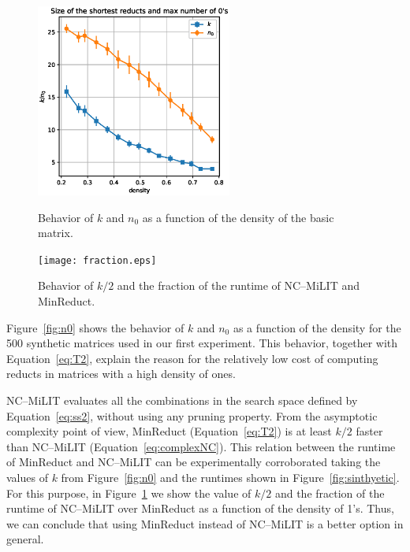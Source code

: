\documentclass[citenumber]{llncs}
\begin{document}
	\begin{figure}[hbt] 
		\begin{minipage}[t]{.48\linewidth}
			\begin{center}
				\includegraphics[height=2.5in]{Length_and_N0_vs_denisty.eps} 
			\end{center}
			\caption{Behavior of $k$ and $n_0$ as a function of the density of the basic matrix.}\label{fig:n0}
		\end{minipage}
		\begin{minipage}[t]{.48\linewidth}
			\begin{center}
				\texttt{[image: fraction.eps]} 
			\end{center}
			\caption{Behavior of $k/2$ and the fraction of the runtime of NC--MiLIT and MinReduct.}\label{fig:fraction}			
		\end{minipage}
	\end{figure} 
	
	Figure~\ref{fig:n0} shows the behavior of $k$ and $n_0$ as a function of the density for the 500 synthetic matrices used in our first experiment. This behavior, together with Equation~\ref{eq:T2}, explain the reason for the relatively low cost of computing reducts in matrices with a high density of ones.
	
	NC--MiLIT evaluates all the combinations in the search space defined by Equation~\ref{eq:ss2}, without using any pruning property. From the asymptotic complexity point of view, MinReduct (Equation~\ref{eq:T2}) is at least $k/2$ faster than NC--MiLIT (Equation~\ref{eq:complexNC}). This relation between the runtime of MinReduct and NC--MiLIT can be experimentally corroborated taking the values of $k$ from Figure~\ref{fig:n0} and the runtimes shown in Figure~\ref{fig:sinthyetic}. For this purpose, in Figure~\ref{fig:fraction} we show the value of $k/2$ and the fraction of the runtime of NC--MiLIT over MinReduct as a function of the density of 1's. Thus, we can conclude that using MinReduct instead of NC--MiLIT is a better option in general.
\end{document}
